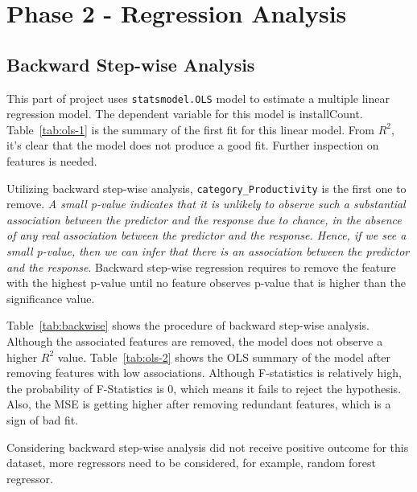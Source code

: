 \section{Phase 2 - Regression Analysis}

\subsection{Backward Step-wise Analysis}

This part of project uses \texttt{statsmodel.OLS} model to estimate a multiple linear regression model. The dependent variable for this model is installCount. Table~\ref{tab:ols-1} is the summary of the first fit for this linear model. From $R^2$, it's clear that the model does not produce a good fit. Further inspection on features is needed. 

Utilizing backward step-wise analysis, \texttt{category\_Productivity} is the first one to remove.\textit{ A small p-value indicates that it is unlikely to observe such a substantial association between the predictor and the response due to chance, in the absence of any real association between the predictor and the response. Hence, if we see a small p-value, then we can infer that there is an association between the predictor and the response}\cite{james2023introduction}. Backward step-wise regression requires to remove the feature with the highest p-value until no feature observes p-value that is higher than the significance value.

Table~\ref{tab:backwise} shows the procedure of backward step-wise analysis. Although the associated features are removed, the model does not observe a higher $R^2$ value. Table~\ref{tab:ols-2} shows the OLS summary of the model after removing features with low associations. Although F-statistics is relatively high, the probability of F-Statistics is 0, which means it fails to reject the hypothesis. Also, the MSE is getting higher after removing redundant features, which is a sign of bad fit.

Considering backward step-wise analysis did not receive positive outcome for this dataset, more regressors need to be considered, for example, random forest regressor. 

